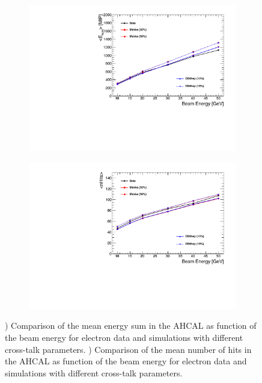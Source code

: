 \begin{figure}[htbp!]
  \centering
  \begin{subfigure}[t]{0.49\textwidth}
    \includegraphics[width=1.\linewidth]{chap5/fig_AHCAL_Timing/Electrons/EsumElectrons_BeamEnergy.pdf}
    \caption{} \label{fig:EsumMean}
  \end{subfigure}
  \hfill
  \begin{subfigure}[t]{0.49\textwidth}
    \includegraphics[width=1.\linewidth]{chap5/fig_AHCAL_Timing/Electrons/nHitsElectrons_BeamEnergy.pdf}
    \caption{} \label{fig:nHitsMean}
  \end{subfigure}
  \caption{) Comparison of the mean energy sum in the AHCAL as function of the beam energy for electron data and simulations with different cross-talk parameters. ) Comparison of the mean number of hits in the AHCAL as function of the beam energy for electron data and simulations with different cross-talk parameters.}
  \label{fig:eVal}
\end{figure}

